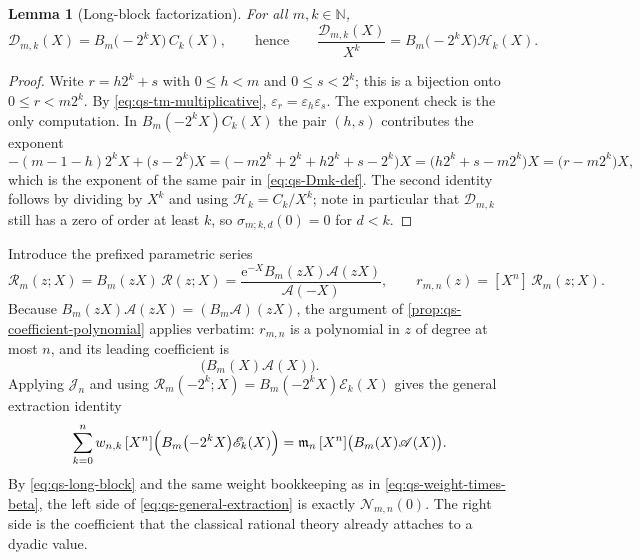 \documentclass[11pt,oneside]{article}
\newtheorem{lemma}[theorem]{Lemma}
\theoremstyle{definition}
\theoremstyle{remark}
\newcommand{\N}{\mathbb N}
\newcommand{\e}{\mathrm e}
\begin{document}
\begin{lemma}[Long-block factorization]
\label{lem:qs-long-block}
For all $m,k\in\N$,
\begin{equation}
 \mathscr D_{m,k}(X)=B_m\bigl(-2^kX\bigr)\,C_k(X),
 \qquad\text{hence}\qquad
 \frac{\mathscr D_{m,k}(X)}{X^k}=B_m\bigl(-2^kX\bigr)\mathscr H_k(X). \label{eq:qs-long-block}
\end{equation}
\end{lemma}

\begin{proof}
Write $r=h2^k+s$ with $0\le h<m$ and $0\le s<2^k$; this is a bijection onto
$0\le r<m2^k$.  By \eqref{eq:qs-tm-multiplicative}, $\varepsilon_r=\varepsilon_h\varepsilon_s$.
The exponent check is the only computation.  In $B_m(-2^kX)C_k(X)$ the pair $(h,s)$
contributes the exponent
\begin{equation*}
 -(m-1-h)2^kX+\bigl(s-2^k\bigr)X
 =\bigl(-m2^k+2^k+h2^k+s-2^k\bigr)X
 =\bigl(h2^k+s-m2^k\bigr)X
 =\bigl(r-m2^k\bigr)X,
\end{equation*}
which is the exponent of the same pair in \eqref{eq:qs-Dmk-def}.  The second identity follows
by dividing by $X^k$ and using $\mathscr H_k=C_k/X^k$; note in particular that
$\mathscr D_{m,k}$ still has a zero of order at least $k$, so
$\sigma_{m;k,d}(0)=0$ for $d<k$.
\end{proof}

Introduce the prefixed parametric series
\begin{equation}
 \mathscr R_m(z;X)=B_m(zX)\,\mathscr R(z;X)
 =\frac{\e^{-X}B_m(zX)\mathscr A(zX)}{\mathscr A(-X)},
 \qquad
 r_{m,n}(z)=[X^n]\,\mathscr R_m(z;X).                      \label{eq:qs-Rm-def}
\end{equation}
Because $B_m(zX)\mathscr A(zX)=(B_m\mathscr A)(zX)$, the argument of
\cref{prop:qs-coefficient-polynomial} applies verbatim: $r_{m,n}$ is a polynomial in $z$ of
degree at most $n$, and its leading coefficient is
\begin{equation}
 [X^n]\bigl(B_m(X)\mathscr A(X)\bigr).                     \label{eq:qs-prefix-leading}
\end{equation}
Applying $\mathcal J_n$ and using $\mathscr R_m(-2^k;X)=B_m(-2^kX)\mathscr E_k(X)$ gives the
general extraction identity
\begin{equation}
 \sum_{k=0}^{n}w_{n,k}\,[X^n]\Bigl(B_m\bigl(-2^kX\bigr)\mathscr E_k(X)\Bigr)
 =\mathfrak m_n\,[X^n]\bigl(B_m(X)\mathscr A(X)\bigr).     \label{eq:qs-general-extraction}
\end{equation}
By \eqref{eq:qs-long-block} and the same weight bookkeeping as in
\eqref{eq:qs-weight-times-beta}, the left side of \eqref{eq:qs-general-extraction} is exactly
$\mathcal N_{m,n}(0)$.  The right side is the coefficient that the classical rational theory
already attaches to a dyadic value.
\end{document}
